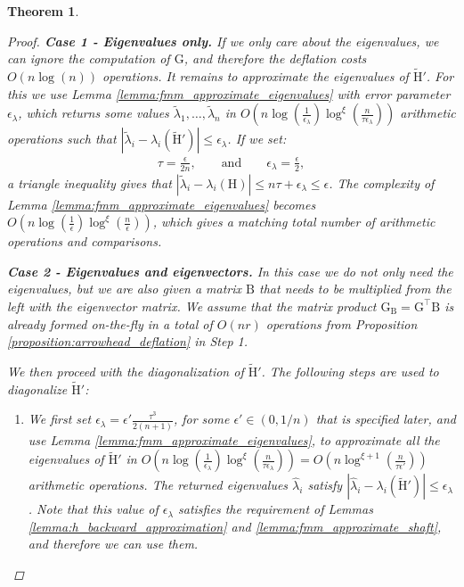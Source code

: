 \documentclass{article}
\newcommand{\lpar}{\left(}
\newcommand{\rpar}{\right)}
\newtheorem{theorem}{Theorem}[section]
\newcommand\matB{\boldsymbol{\mathrm{B}}}
\newcommand\matG{\boldsymbol{\mathrm{G}}}
\newcommand\matH{\boldsymbol{\mathrm{H}}}
\newcommand\matHtilde{\widetilde{\boldsymbol{\mathrm{H}}}}
\newcommand{\cfmm}{\xi}
\begin{document}
\begin{theorem}
\begin{proof}
        \textbf{Case 1 - Eigenvalues only.} If we only care about the eigenvalues, we can ignore the computation of $\matG$, and therefore the deflation costs $O(n\log(n))$ operations. 
        It remains to approximate the eigenvalues of $\matHtilde'$. 
        For this we  use Lemma \ref{lemma:fmm_approximate_eigenvalues} with error parameter $\epsilon_{\lambda}$, which returns some values $\widetilde\lambda_1,\ldots,\widetilde\lambda_n$ in $O\lpar
            n\log(\tfrac{1}{\epsilon_{\lambda}})\log^{\cfmm}(\frac{n}{\tau\epsilon_{\lambda}})
        \rpar$ arithmetic operations such that $|\widetilde\lambda_i-\lambda_i(\matHtilde')|\leq \epsilon_{\lambda}$. 
        If we set:
        \begin{align*}
            \tau=\frac{\epsilon}{2n},
            \qquad
            \text{and}
            \qquad
            \epsilon_{\lambda}=\frac{\epsilon}{2},
        \end{align*}
        a triangle inequality gives that $|\widetilde\lambda_i-\lambda_i(\matH)|\leq n\tau+\epsilon_{\lambda}\leq \epsilon$.
        The complexity of Lemma \ref{lemma:fmm_approximate_eigenvalues} becomes $O\lpar
            n\log(\frac{1}{\epsilon})\log^{\cfmm}(\frac{n}{\epsilon})
        \rpar$, which gives a matching total number of arithmetic operations and comparisons.

        \textbf{Case 2 - Eigenvalues and eigenvectors.}
        In this case we do not only need the eigenvalues, but we are also given a matrix $\matB$ that needs to be multiplied from the left with the eigenvector matrix. We assume that the matrix product $\matG_{\matB}=\matG^\top\matB$ is already formed on-the-fly in a total of $O(nr)$ operations from Proposition \ref{proposition:arrowhead_deflation} in Step 1.
        
        We then proceed with the diagonalization of $\matHtilde'$. 
        The following steps are used to diagonalize $\matHtilde'$:
        \begin{enumerate}
            \item 
            We first set 
            $\epsilon_{\lambda}=\epsilon'\tfrac{\tau^3}{2(n+1)}$, for some $\epsilon'\in(0,1/n)$ that is specified later,
            and use Lemma \ref{lemma:fmm_approximate_eigenvalues}, to approximate all the eigenvalues of $\matHtilde'$  in 
            $O\lpar
                n\log(\tfrac{1}{\epsilon_{\lambda}})\log^{\cfmm}(\frac{n}{\tau\epsilon_{\lambda}})
            \rpar
            =
            O\lpar
                n\log^{\cfmm+1}(\frac{n}{\tau\epsilon'})
            \rpar$
            arithmetic operations. 
            The returned eigenvalues $\widehat\lambda_i$ satisfy $|\widehat\lambda_i-\lambda_i(\matHtilde')|\leq \epsilon_{\lambda}$.
            Note that this value of $\epsilon_{\lambda}$ satisfies the requirement of Lemmas \ref{lemma:h_backward_approximation} and \ref{lemma:fmm_approximate_shaft}, and therefore we can use them.
            

\end{enumerate}
\end{proof}
\end{theorem}
\end{document}
